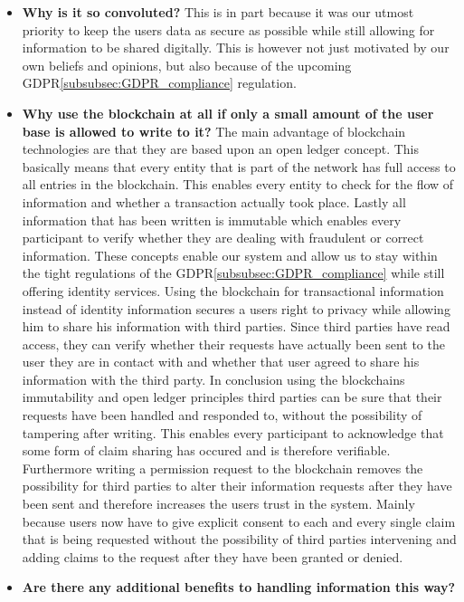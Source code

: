 \begin{itemize}
\item \label{design_pecularity_one} \textbf{Why is it so convoluted?}
This is in part because it was our utmost priority to keep the users data as secure as possible while still allowing for information to be shared digitally.
This is however not just motivated by our own beliefs and opinions, but also because of the upcoming GDPR\ref{subsubsec:GDPR_compliance} regulation.
\item \label{design_pecularity_two} \textbf{Why use the blockchain at all if only a small amount of the user base is allowed to write to it?}
The main advantage of blockchain technologies are that they are based upon an open ledger concept. This basically means that every entity that is part of the network has full access to all entries in the blockchain.
This enables every entity to check for the flow of information and whether a transaction actually took place. Lastly all information that has been written is immutable which enables every participant to verify whether they are dealing with
fraudulent or correct information.
These concepts enable our system and allow us to stay within the tight regulations of the GDPR\ref{subsubsec:GDPR_compliance} while still offering identity services. Using the blockchain for transactional information instead of identity information
secures a users right to privacy while allowing him to share his information with third parties. Since third parties have read access, they can verify whether their requests have actually been sent to the user they are in contact with and
whether that user agreed to share his information with the third party.
In conclusion using the blockchains immutability and open ledger principles third parties can be sure that their requests have been handled and responded to, without the possibility of tampering after writing.
This enables every participant to acknowledge that some form of claim sharing has occured and is therefore verifiable.
Furthermore writing a permission request to the blockchain removes the possibility for third parties to alter their information requests after they have been sent and therefore increases the users trust in the system.
Mainly because users now have to give explicit consent to each and every single claim that is being requested without the possibility of third parties intervening and adding claims to the request after they have been granted or denied.
\item \label{design_pecularity_three} \textbf{Are there any additional benefits to handling information this way?}

\end{itemize}
